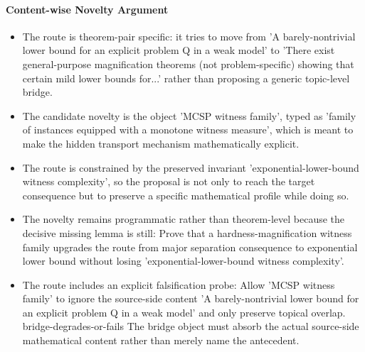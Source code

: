 \documentclass[11pt]{article}
\begin{document}
\paragraph{Content-wise Novelty Argument}
\begin{itemize}[leftmargin=*,itemsep=0.2em]
\item The route is theorem-pair specific: it tries to move from 'A barely-nontrivial lower bound for an explicit problem Q in a weak model' to 'There exist general-purpose magnification theorems (not problem-specific) showing that certain mild lower bounds for...' rather than proposing a generic topic-level bridge.
\item The candidate novelty is the object 'MCSP witness family', typed as 'family of instances equipped with a monotone witness measure', which is meant to make the hidden transport mechanism mathematically explicit.
\item The route is constrained by the preserved invariant 'exponential-lower-bound witness complexity', so the proposal is not only to reach the target consequence but to preserve a specific mathematical profile while doing so.
\item The novelty remains programmatic rather than theorem-level because the decisive missing lemma is still: Prove that a hardness-magnification witness family upgrades the route from major separation consequence to exponential lower bound without losing 'exponential-lower-bound witness complexity'.
\item The route includes an explicit falsification probe: Allow 'MCSP witness family' to ignore the source-side content 'A barely-nontrivial lower bound for an explicit problem Q in a weak model' and only preserve topical overlap. bridge-degrades-or-fails The bridge object must absorb the actual source-side mathematical content rather than merely name the antecedent.
\end{itemize}
\end{document}

